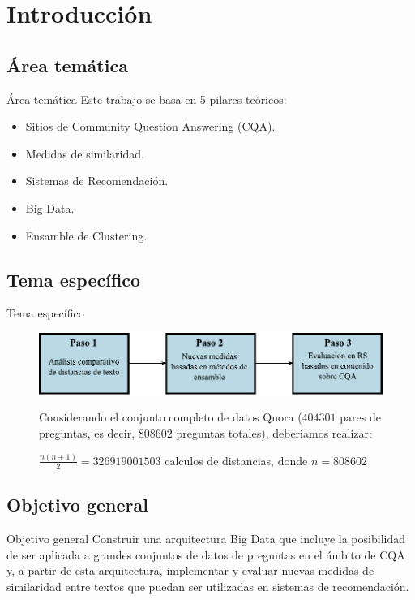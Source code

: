 \section{Introducción}

\subsection{Área temática}
\begin{frame}{Área temática}
	Este trabajo se basa en 5 pilares teóricos:
	\begin{itemize} [<+>]
		\item Sitios de Community Question Answering (CQA).
		\item Medidas de similaridad.
		\item Sistemas de Recomendación.
		\item Big Data.
		\item Ensamble de Clustering.
	\end{itemize}
\end{frame}

\subsection{Tema específico}
\begin{frame}[allowframebreaks]{Tema específico}
	\begin{figure}
		\centering
		\includegraphics[width=0.7\linewidth]{../5_introduccion/imagenes/pipeline}
		\label{fig:pipeline}

		\framebreak

		Considerando el conjunto completo de datos Quora (\(404301\) pares de preguntas, es decir, \(808602\) preguntas totales), deberiamos realizar:

		\bigskip $\frac{n(n+1)}{2} = 326919001503$ calculos de distancias, donde $n = 808602$
	\end{figure}
\end{frame}

\subsection{Objetivo general}
\begin{frame}{Objetivo general}
	Construir una arquitectura Big Data que incluye la posibilidad de ser aplicada a grandes conjuntos de datos de preguntas en el ámbito de CQA y, a partir de esta arquitectura, implementar y evaluar nuevas medidas de similaridad entre textos que puedan ser utilizadas en sistemas de recomendación.
\end{frame}

